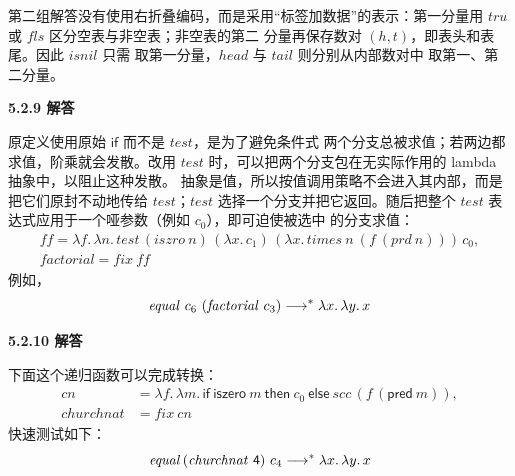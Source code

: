 \begin{taplauthorsolutionentrybox}
{第二组解答没有使用右折叠编码，而是采用“标签加数据”的表示：第一分量用
\(\mathit{tru}\) 或 \(\mathit{fls}\) 区分空表与非空表；非空表的第二
分量再保存数对 \((h,t)\)，即表头和表尾。因此 \(\mathit{isnil}\) 只需
取第一分量，\(\mathit{head}\) 与 \(\mathit{tail}\) 则分别从内部数对中
取第一、第二分量。}

\end{taplauthorsolutionentrybox}

\begin{taplauthorsolutionentrybox}
\label{sol:author:5.2.9}
\textbf{5.2.9 解答}

原定义使用原始 \(\mathsf{if}\) 而不是 \(\mathit{test}\)，是为了避免条件式
两个分支总被求值；若两边都求值，阶乘就会发散。改用 \(\mathit{test}\)
时，可以把两个分支包在无实际作用的 lambda 抽象中，以阻止这种发散。
抽象是值，所以按值调用策略不会进入其内部，而是把它们原封不动地传给
\(\mathit{test}\)；\(\mathit{test}\) 选择一个分支并把它返回。随后把整个
\(\mathit{test}\) 表达式应用于一个哑参数（例如 \(c_0\)），即可迫使被选中
的分支求值：
\[
\begin{aligned}
\mathit{ff}
  =\lambda f.\,\lambda n.\,
  \mathit{test}\,
    (\mathit{iszro}\ n)\,
    (\lambda x.\,c_1)\,
    (\lambda x.\,\mathit{times}\ n\ (f\ (\mathit{prd}\ n)))\,
    c_0,\\
\mathit{factorial}
  =\mathit{fix}\ \mathit{ff}
\end{aligned}
\]
例如，
\[
  \mathit{equal}\ c_6\ (\mathit{factorial}\ c_3)
  \mathrel{\longrightarrow^{*}} \lambda x.\,\lambda y.\,x
\]

\end{taplauthorsolutionentrybox}

\begin{taplauthorsolutionentrybox}
\label{sol:author:5.2.10}
\textbf{5.2.10 解答}

下面这个递归函数可以完成转换：
\[
\begin{aligned}
\mathit{cn}
  &=\lambda f.\,\lambda m.\,
    \mathsf{if}\ \mathsf{iszero}\ m\ \mathsf{then}\ c_0\
    \mathsf{else}\ \mathit{scc}\,(f\,(\mathsf{pred}\ m)),\\
\mathit{churchnat}
  &=\mathit{fix}\ \mathit{cn}
\end{aligned}
\]
快速测试如下：
\[
  \mathit{equal}\,(\mathit{churchnat}\ \mathsf{4})\ c_4
  \transmulti \lambda x.\,\lambda y.\,x
\]

\end{taplauthorsolutionentrybox}

